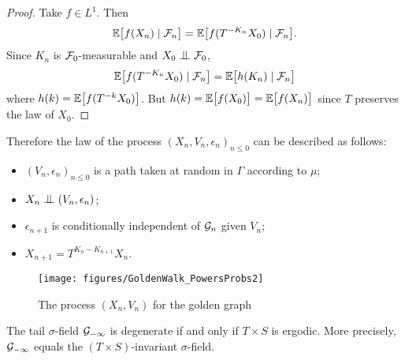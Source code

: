 \documentclass[12pt,a4paper]{article}
\begin{document}
\begin{proof}
Take $f \in L^1$. Then
$$
\mathbb{E}\bigl[ f(X_n) \mid \mathcal{F}_n\bigr] 
= \mathbb{E}\bigl[ f(T^{-K_n}X_0) \mid \mathcal{F}_n\bigr]. 
$$
Since $K_n$ is $\mathcal{F}_0$-measurable and $X_0 \indep \FF_0$, 
$$
\mathbb{E}\bigl[ f(T^{-K_n}X_0) \mid \mathcal{F}_n\bigr] = 
\mathbb{E}\bigl[ h(K_n) \mid \mathcal{F}_n\bigr]
$$
where $h(k) = \mathbb{E}\bigl[ f(T^{-k}X_0)\bigr]$. 
But $h(k) =   \mathbb{E}\bigl[ f(X_0)\bigr]=  \mathbb{E}\bigl[ f(X_n)\bigr]$ 
since $T$ preserves the law of $X_0$. 
\end{proof}

Therefore the law of the process ${(X_n,V_n,\epsilon_n)}_{n \leq 0}$ can 
be described as follows:
\begin{itemize}
\item ${(V_n,\epsilon_n)}_{n \leq 0}$ is a path taken at random in $\Gamma$ 
according to $\mu$;

\item $X_n \indep (V_n,\epsilon_n)$;

\item $\epsilon_{n+1}$ is conditionally independent of $\mathcal{G}_n$ given $V_n$;

\item $X_{n+1} = T^{K_n-K_{n+1}}X_n$.
\end{itemize}


\begin{figure}[!h]
\centering
	\texttt{[image: figures/GoldenWalk\_PowersProbs2]}
\caption{The process $(X_n, V_n)$ for the golden graph}
\end{figure}

\begin{ppsition}\label{ppsition:tailfield}
The tail $\sigma$-field $\mathcal{G}_{-\infty}$ is degenerate if and only if $T \times S$ is ergodic. 
More precisely, $\mathcal{G}_{-\infty}$ equals  the $(T\times S)$-invariant $\sigma$-field. 
\end{ppsition}
 
\end{document}
